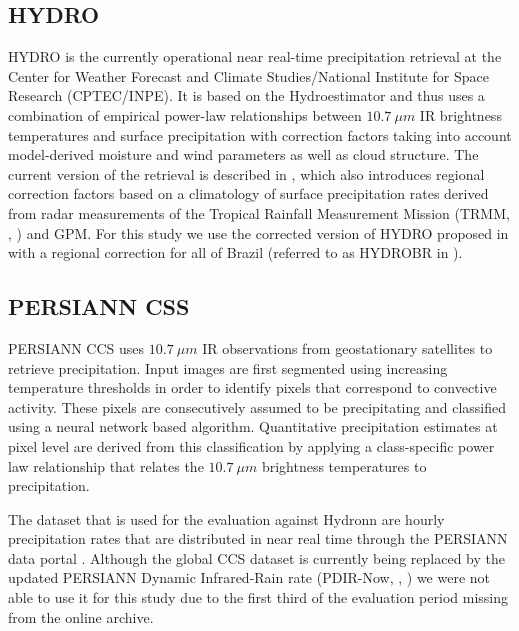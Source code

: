 \documentclass[journal abbreviation, manuscript]{copernicus}
\begin{document}
\subsection{HYDRO}

HYDRO is the currently operational near real-time precipitation retrieval at the
Center for Weather Forecast and Climate Studies/National Institute for Space
Research (CPTEC/INPE). It is based on the Hydroestimator \citep{scofield03} and
thus uses a combination of empirical power-law relationships between
$10.7\ \unit{\mu m}$ IR brightness temperatures and surface precipitation with
correction factors taking into account model-derived moisture and wind
parameters as well as cloud structure. The current version of the retrieval is
described in \citet{siqueira19}, which also introduces regional correction
factors based on a climatology of surface precipitation rates derived from radar
measurements of the Tropical Rainfall Measurement Mission (TRMM,
\citeauthor{simpson96}, \citeyear{simpson96}) and GPM. For this study we use the
corrected version of HYDRO proposed in \citet{siqueira19} with a regional
correction for all of Brazil (referred to as HYDROBR in \citet{siqueira19}).


\subsection{PERSIANN CSS}

PERSIANN CCS \citep{hong04} uses $10.7\ \unit{\mu m}$ IR observations from
geostationary satellites to retrieve precipitation. Input images are first
segmented using increasing temperature thresholds in order to identify pixels
that correspond to convective activity. These pixels are consecutively assumed
to be precipitating and classified using a neural network based algorithm.
Quantitative precipitation estimates at pixel level are derived from this
classification by applying a class-specific power law relationship that relates
the $10.7\ \unit{\mu m}$ brightness temperatures to precipitation.

The dataset that is used for the evaluation against Hydronn are hourly
precipitation rates that are distributed in near real time through the PERSIANN
data portal \citep{persiann_data}. Although the global CCS dataset is currently
being replaced by the updated PERSIANN Dynamic Infrared-Rain rate (PDIR-Now,
\citeauthor{nguyen20}, \citeyear{nguyen20}) we were not able to use it for this
study due to the first third of the evaluation period missing from the online
archive.
\end{document}
